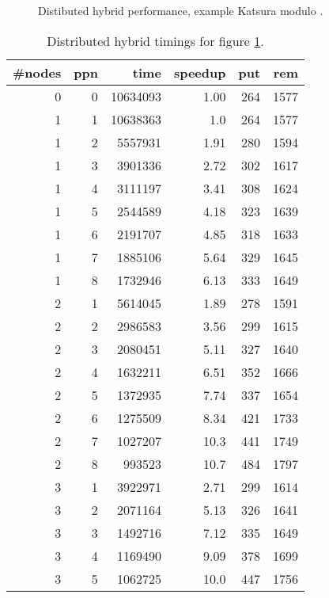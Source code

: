 \documentclass[10pt,twocolumn,a4paper]{article}
\begin{document}
\begin{figure}[thb]
\centering
{}
\caption{Distibuted hybrid performance, example Katsura modulo .}
\label{fig:k8m2hybrid}
\end{figure}

\begin{table}[thb]
\centering
\caption{Distributed hybrid timings for figure \ref{fig:k8m2hybrid}.}
\label{fig:kat8_distm2}
\small{
\clearpage{}
\begin{tabular}{|r|r|r|r|r|r|}
\hline
\#nodes & ppn & time & speedup & put & rem 
\\ \hline
 0 & 0 & 10634093 & 1.00 & 264 & 1577
\\ \hline
 1 & 1 & 10638363 & 1.0 & 264 & 1577
\\ \hline
 1 & 2 & 5557931  & 1.91 & 280 & 1594
\\ \hline
 1 & 3 & 3901336  & 2.72 & 302 & 1617
\\ \hline
 1 & 4 & 3111197  & 3.41 & 308 & 1624
\\ \hline
 1 & 5 & 2544589  & 4.18 & 323 & 1639
\\ \hline
 1 & 6 & 2191707  & 4.85 & 318 & 1633
\\ \hline
 1 & 7 & 1885106  & 5.64 & 329 & 1645
\\ \hline
 1 & 8 & 1732946  & 6.13 & 333 & 1649
\\ \hline
 2 & 1 & 5614045  & 1.89 & 278 & 1591
\\ \hline
 2 & 2 & 2986583  & 3.56 & 299 & 1615
\\ \hline
 2 & 3 & 2080451  & 5.11 & 327 & 1640
\\ \hline
 2 & 4 & 1632211  & 6.51 & 352 & 1666
\\ \hline
 2 & 5 & 1372935  & 7.74 & 337 & 1654
\\ \hline
 2 & 6 & 1275509  & 8.34 & 421 & 1733
\\ \hline
 2 & 7 & 1027207  & 10.3 & 441 & 1749
\\ \hline
 2 & 8 & 993523  & 10.7 & 484 & 1797
\\ \hline
 3 & 1 & 3922971 & 2.71 & 299 & 1614
\\ \hline
 3 & 2 & 2071164 & 5.13 & 326 & 1641
\\ \hline
 3 & 3 & 1492716 & 7.12 & 335 & 1649
\\ \hline
 3 & 4 & 1169490 & 9.09 & 378 & 1699
\\ \hline
 3 & 5 & 1062725 & 10.0 & 447 & 1756
\\ \hline

\end{tabular}}
\end{table}
\end{document}
